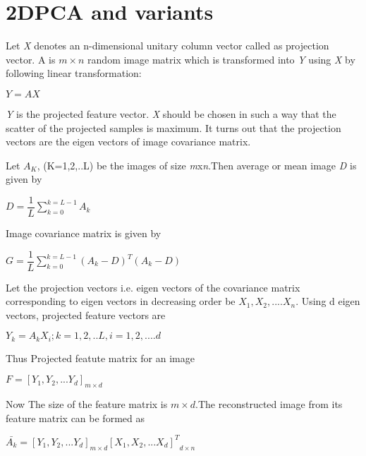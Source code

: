 \documentclass[a4paper, 12pt, notitlepage]{report}
\begin{document}
\section{2DPCA and variants}
%
Let \textit{X} denotes an n-dimensional unitary column vector called as projection vector. A is $ m \times n $ random image matrix which is transformed into \textit{Y} using \textit{X} by following linear transformation:
\begin{center}
	$ Y = AX  $  
\end{center}
\textit{Y} is the projected feature vector. \textit{X} should be chosen in such a way that the scatter of the projected samples is maximum. It turns out that the projection vectors are the eigen vectors of image covariance matrix.

Let  $A_K $, (K=1,2,..L) be the images of size \textit{m}x\textit{n}.Then average or mean image \textit{D} is given by
\begin{center}
	 $ D = \dfrac{1}{L} \displaystyle\sum_{k=0}^{k=L-1} A_k $ 
\end{center}
Image covariance matrix is given by
\begin{center}
$ G = \dfrac{1}{L} \displaystyle\sum_{k=0}^{k=L-1} {(A_k-D)}^{T}{(A_k-D)} $ 
\end{center} 
Let the projection vectors i.e. eigen vectors of the covariance matrix corresponding to eigen vectors in decreasing order be $ X_1,X_2,....X_n $. Using d eigen vectors, projected feature vectors are
\begin{center}
$ Y_k = A_kX_i; k = 1,2,..L, i = 1,2,....d $
\end{center}
Thus Projected featute matrix for an image
\begin{center}
$ F = {[Y_1, Y_2,...Y_d]}_{m \times d} $
\end{center}
Now The size of the feature matrix is $m \times d$.The reconstructed image from its feature matrix can be formed as
\begin{center}
$ \bar{A_k} = {[Y_1, Y_2, ...Y_d]}_{m \times d}{{[X_1, X_2,...X_d]}^{T}}_{d \times n} $
\end{center}
\end{document}
